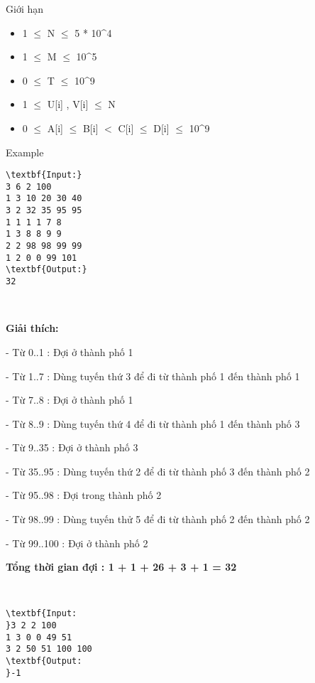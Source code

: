 Giới hạn
\begin{itemize}
	\item 1  $\le$  N  $\le$  5 * 10^4
	\item 1  $\le$  M  $\le$  10^5
	\item 0  $\le$  T  $\le$  10^9
	\item 1  $\le$  U[i] , V[i]  $\le$  N
	\item 0  $\le$  A[i]  $\le$  B[i] $<$ C[i]  $\le$  D[i]  $\le$  10^9
\end{itemize}
Example
\begin{verbatim}
\textbf{Input:}
3 6 2 100
1 3 10 20 30 40
3 2 32 35 95 95
1 1 1 1 7 8
1 3 8 8 9 9
2 2 98 98 99 99
1 2 0 0 99 101
\textbf{Output:}
32\end{verbatim}

 

\textbf{Giải thích:}


- Từ 0..1 : Đợi ở thành phố 1


- Từ 1..7 : Dùng tuyến thứ 3 để đi từ thành phố 1 đến thành phố 1


- Từ 7..8 : Đợi ở thành phố 1


- Từ 8..9 : Dùng tuyến thứ 4 để đi từ thành phố 1 đến thành phố 3


- Từ 9..35 : Đợi ở thành phố 3


- Từ 35..95 : Dùng tuyến thứ 2 để đi từ thành phố 3 đến thành phố 2


- Từ 95..98 : Đợi trong thành phố 2


- Từ 98..99 : Dùng tuyến thử 5 để đi từ thành phố 2 đến thành phố 2


- Từ 99..100 : Đợi ở thành phố 2


\textbf{Tổng thời gian đợi : 1 + 1 + 26 + 3 + 1 = 32}

 
\begin{verbatim}
\textbf{Input:
}3 2 2 100
1 3 0 0 49 51
3 2 50 51 100 100
\textbf{Output:
}-1
\end{verbatim}